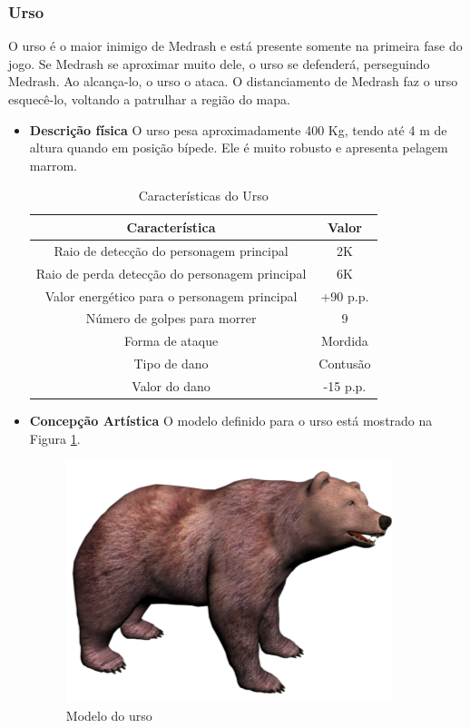 \subsubsection{Urso}
O urso é o maior inimigo de Medrash e está presente somente na primeira
 fase do jogo. Se Medrash se aproximar muito dele, o urso se defenderá,
 perseguindo Medrash. Ao alcança-lo, o urso o ataca. O distanciamento de
 Medrash faz o urso esquecê-lo, voltando a patrulhar a região do mapa.
\begin{itemize}
\item {\bf Descrição física}
O urso pesa aproximadamente 400 Kg, tendo até 4 m de altura quando em
 posição bípede. Ele é muito robusto e apresenta pelagem marrom.


\begin{table}[!ht]
\begin{center}
\begin{tabular}{|c|c|}
\hline 
\textbf{Característica} & \textbf{Valor} \\ 
\hline 
Raio de detecção do personagem principal & 2K \\ 
\hline 
Raio de perda detecção do personagem principal & 6K \\ 
\hline 
Valor energético para o personagem principal & +90 p.p. \\ 
\hline 
Número de golpes para morrer & 9 \\ 
\hline 
Forma de ataque & Mordida \\ 
\hline 
Tipo de dano & Contusão \\ 
\hline 
Valor do dano & -15 p.p. \\ 
\hline 
\end{tabular} 
\caption{Características do Urso}
\end{center}
\end{table}


\item {\bf Concepção Artística}
O modelo definido para o urso está mostrado na Figura \ref{img:urso}.

\begin{figure}[ht]
 \centering
 \includegraphics[scale=0.8]{Imagens/urso01.png}
 \caption{Modelo do urso}
\label{img:urso}
\end{figure}


\end{itemize}
